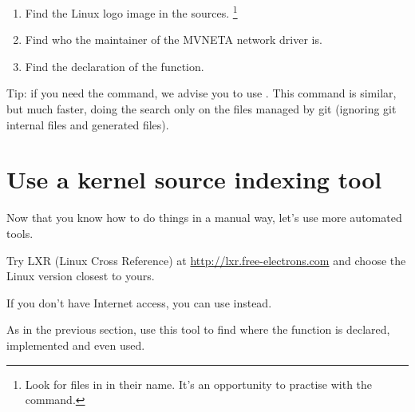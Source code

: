 \begin{enumerate}
\item Find the Linux logo image in the sources.
      \footnote{Look for files in  in their name. It's an 
      opportunity to practise with the  command.}
\item Find who the maintainer of the MVNETA network driver is.
\item Find the declaration of the  function.
\end{enumerate}

Tip: if you need the  command, we advise you to use . This command is similar, but much faster, doing the search only
on the files managed by git (ignoring git internal files and generated
files). 

\section{Use a kernel source indexing tool}

Now that you know how to do things in a manual way, let's use more
automated tools.

Try LXR (Linux Cross Reference) at \url{http://lxr.free-electrons.com}
and choose the Linux version closest to yours.

If you don't have Internet access, you can use  instead.

As in the previous section, use this tool to find where
the  function is declared, implemented and
even used.
